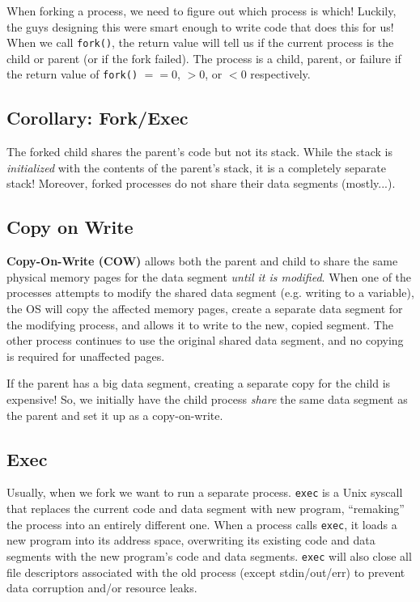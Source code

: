 \documentclass{report}
\newcommand{\definitionBegin}[1]{\begin{tcolorbox}[title={Definition: #1}]}
\newcommand{\definitionEnd}{\end{tcolorbox}}
\newcommand{\exampleBegin}[1]{\begin{tcolorbox}[colback=blue!5!white,colframe=black!75!blue,title={Example:
      #1}]}
\newcommand{\exampleEnd}{\end{tcolorbox}}
\begin{document}
\exampleBegin{Forking Forking}
When forking a process, we need to figure out which process is which! Luckily, the guys designing
this were smart enough to write code that does this for us! When we call \texttt{fork()}, the return
value will tell us if the current process is the child or parent (or if the fork failed). The
process is a child, parent, or failure if the return value of \texttt{fork()} $== 0$, $> 0$, or $<
0$ respectively.
\exampleEnd


\subsection{Corollary: Fork/Exec}
The forked child shares the parent's code but not its stack. While the stack is \textit{initialized}
with the contents of the parent's stack, it is a completely separate stack! Moreover, forked
processes do not share their data segments (mostly...).


\subsection*{Copy on Write}
\definitionBegin{Copy-On-Write}
\textbf{Copy-On-Write (COW)} allows both the parent and child to share the same physical memory
pages for the data segment \textit{until it is modified}. When one of the processes attempts to
modify the shared data segment (e.g. writing to a variable), the OS will copy the affected memory
pages, create a separate data segment for the modifying process, and allows it to write to
the new, copied segment. The other process continues to use the original shared data segment, and no
copying is required for unaffected pages.
\definitionEnd
If the parent has a big data segment, creating a separate copy for the child is expensive! So, we
initially have the child process \textit{share} the same data segment as the parent and set it up as
a copy-on-write.


\subsection*{Exec}
Usually, when we fork we want to run a separate process. \texttt{exec} is a Unix syscall that
replaces the current code and data segment with new program, ``remaking'' the process into an
entirely different one. When a process calls \texttt{exec}, it loads a new program into its address
space, overwriting its existing code and data segments with the new program's code and data
segments. \texttt{exec} will also close all file descriptors associated with the old process (except
stdin/out/err) to prevent data corruption and/or resource leaks. 
\end{document}
